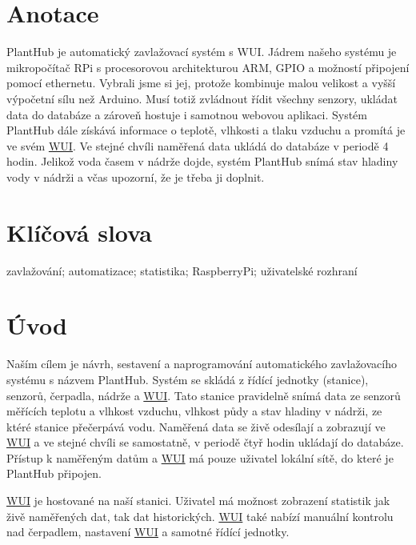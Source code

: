 \documentclass[12pt,a4paper]{article}
\begin{document}
\clearpage

\section*{Anotace}

PlantHub je automatický zavlažovací systém s \ac{WUI}. Jádrem našeho systému je mikropočítač \ac{RPi} s procesorovou architekturou \ac{ARM}, \ac{GPIO} a možností připojení pomocí ethernetu. Vybrali jsme si jej, protože kombinuje malou velikost a vyšší výpočetní sílu než Arduino. Musí totiž zvládnout řídit všechny senzory, ukládat data do databáze a zároveň hostuje i samotnou webovou aplikaci. Systém PlantHub dále získává informace o teplotě, vlhkosti a tlaku vzduchu a promítá je ve svém \underline{\underline{\ac{WUI}}}. Ve stejné chvíli naměřená data ukládá do databáze v periodě 4 hodin. Jelikož voda časem v nádrže dojde, systém PlantHub snímá stav hladiny vody v nádrži a včas upozorní, že je třeba ji doplnit.

\section*{Klíčová slova}

\noindent zavlažování; automatizace; statistika; RaspberryPi; uživatelské rozhraní

\clearpage

\tableofcontents

\clearpage

\section{Úvod}

Naším cílem je návrh, sestavení a naprogramování automatického zavlažovacího systému s názvem PlantHub. Systém se skládá z řídící jednotky (stanice), senzorů, čerpadla, nádrže a \space \underline{\ac{WUI}}. Tato stanice pravidelně snímá data ze senzorů měřících teplotu a vlhkost vzduchu, vlhkost půdy a stav hladiny v nádrži, ze ktéré stanice přečerpává vodu. Naměřená data se živě odesílají a zobrazují ve \underline{\ac{WUI}} a ve stejné chvíli se samostatně, v periodě čtyř hodin ukládají do databáze. Přístup k naměřeným datům a \underline{\ac{WUI}} má pouze uživatel lokální sítě, do které je PlantHub připojen.

\underline{\ac{WUI}} je hostované na naší stanici. Uživatel má možnost zobrazení statistik jak živě naměřených dat, tak dat historických. \underline{\ac{WUI}} také nabízí manuální kontrolu nad čerpadlem, nastavení \underline{\ac{WUI}} a samotné řídící jednotky.
\end{document}
